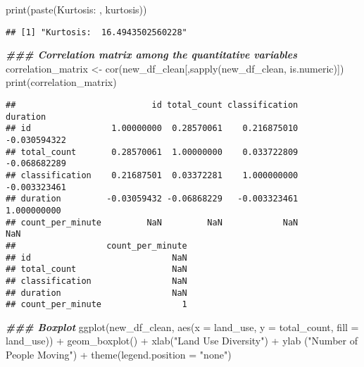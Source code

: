 \documentclass[
]{article}
\newenvironment{Shaded}{\begin{snugshade}}{\end{snugshade}}
\newcommand{\AttributeTok}[1]{\textcolor[rgb]{0.77,0.63,0.00}{#1}}
\newcommand{\DocumentationTok}[1]{\textcolor[rgb]{0.56,0.35,0.01}{\textbf{\textit{#1}}}}
\newcommand{\FunctionTok}[1]{\textcolor[rgb]{0.00,0.00,0.00}{#1}}
\newcommand{\NormalTok}[1]{#1}
\newcommand{\OtherTok}[1]{\textcolor[rgb]{0.56,0.35,0.01}{#1}}
\newcommand{\SpecialCharTok}[1]{\textcolor[rgb]{0.00,0.00,0.00}{#1}}
\newcommand{\StringTok}[1]{\textcolor[rgb]{0.31,0.60,0.02}{#1}}
\begin{document}
\begin{Shaded}
\begin{Highlighting}[]
\FunctionTok{print}\NormalTok{(}\FunctionTok{paste}\NormalTok{(}\StringTok{\textquotesingle{}Kurtosis: \textquotesingle{}}\NormalTok{, kurtosis))}
\end{Highlighting}
\end{Shaded}

\begin{verbatim}
## [1] "Kurtosis:  16.4943502560228"
\end{verbatim}

\begin{Shaded}
\begin{Highlighting}[]
\DocumentationTok{\#\#\# Correlation matrix among the quantitative variables}
\NormalTok{correlation\_matrix }\OtherTok{\textless{}{-}} \FunctionTok{cor}\NormalTok{(new\_df\_clean[,}\FunctionTok{sapply}\NormalTok{(new\_df\_clean, is.numeric)])}
\FunctionTok{print}\NormalTok{(correlation\_matrix)}
\end{Highlighting}
\end{Shaded}

\begin{verbatim}
##                           id total_count classification     duration
## id                1.00000000  0.28570061    0.216875010 -0.030594322
## total_count       0.28570061  1.00000000    0.033722809 -0.068682289
## classification    0.21687501  0.03372281    1.000000000 -0.003323461
## duration         -0.03059432 -0.06868229   -0.003323461  1.000000000
## count_per_minute         NaN         NaN            NaN          NaN
##                  count_per_minute
## id                            NaN
## total_count                   NaN
## classification                NaN
## duration                      NaN
## count_per_minute                1
\end{verbatim}

\begin{Shaded}
\begin{Highlighting}[]
\DocumentationTok{\#\#\# Boxplot}
\FunctionTok{ggplot}\NormalTok{(new\_df\_clean, }\FunctionTok{aes}\NormalTok{(}\AttributeTok{x =}\NormalTok{ land\_use, }\AttributeTok{y =}\NormalTok{ total\_count, }\AttributeTok{fill =}\NormalTok{ land\_use)) }\SpecialCharTok{+}
  \FunctionTok{geom\_boxplot}\NormalTok{() }\SpecialCharTok{+}
  \FunctionTok{xlab}\NormalTok{(}\StringTok{"Land Use Diversity"}\NormalTok{) }\SpecialCharTok{+}
  \FunctionTok{ylab}\NormalTok{ (}\StringTok{"Number of People Moving"}\NormalTok{) }\SpecialCharTok{+}
  \FunctionTok{theme}\NormalTok{(}\AttributeTok{legend.position =} \StringTok{"none"}\NormalTok{)}
\end{Highlighting}
\end{Shaded}
\end{document}
